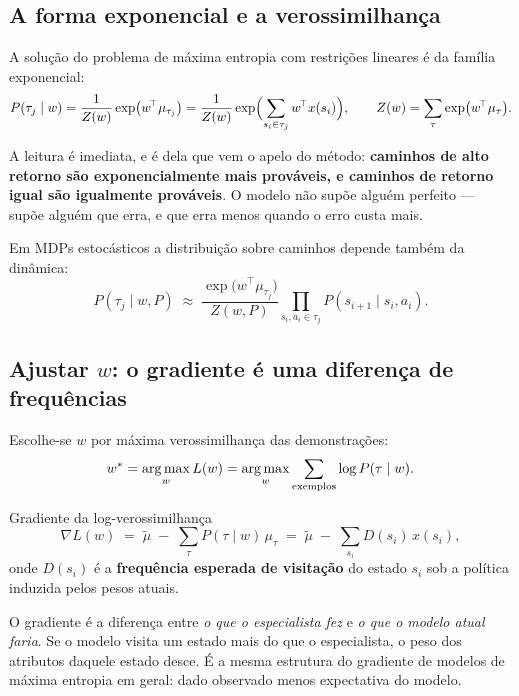 \documentclass[11pt]{article}
\newcommand{\traj}{\tau}
\newcommand{\feat}{x}
\newcommand{\mufeat}{\mu}
\newcommand{\wv}{w}
\begin{document}
\subsection{A forma exponencial e a verossimilhança}

A solução do problema de máxima entropia com restrições lineares é da família
exponencial:
\[
  P(\traj_j \mid \wv) = \frac{1}{Z(\wv)}\exp\bigl(\wv^{\!\top}\mufeat_{\traj_j}\bigr)
   = \frac{1}{Z(\wv)}\exp\Bigl(\sum_{s_i\in\traj_j}\wv^{\!\top}\feat(s_i)\Bigr),
  \qquad
  Z(\wv) = \sum_{\traj}\exp\bigl(\wv^{\!\top}\mufeat_{\traj}\bigr).
\]

A leitura é imediata, e é dela que vem o apelo do método: \textbf{caminhos de alto
retorno são exponencialmente mais prováveis, e caminhos de retorno igual são igualmente
prováveis}. O modelo não supõe alguém perfeito --- supõe alguém que erra, e que erra
menos quando o erro custa mais.

Em MDPs estocásticos a distribuição sobre caminhos depende também da dinâmica:
\[
  P(\traj_j \mid \wv, P) \;\approx\;
    \frac{\exp\bigl(\wv^{\!\top}\mufeat_{\traj_j}\bigr)}{Z(\wv,P)}
    \prod_{s_i,a_i\in\traj_j} P(s_{i+1}\mid s_i,a_i).
\]

\subsection{Ajustar \texorpdfstring{$\wv$}{w}: o gradiente é uma diferença de frequências}

Escolhe-se $\wv$ por máxima verossimilhança das demonstrações:
\[
  \wv^{*} = \argmax_{\wv} L(\wv) = \argmax_{\wv} \sum_{\text{exemplos}} \log P(\traj\mid\wv).
\]

\begin{teobox}{Gradiente da log-verossimilhança}
  \[
    \nabla L(\wv) \;=\; \tilde\mufeat \;-\; \sum_{\traj} P(\traj\mid\wv)\,\mufeat_{\traj}
      \;=\; \tilde\mufeat \;-\; \sum_{s_i} D(s_i)\,\feat(s_i),
  \]
  onde $D(s_i)$ é a \textbf{frequência esperada de visitação} do estado $s_i$ sob a
  política induzida pelos pesos atuais.
\end{teobox}

\begin{ideiabox}
  O gradiente é a diferença entre \emph{o que o especialista fez} e \emph{o que o modelo
  atual faria}. Se o modelo visita um estado mais do que o especialista, o peso dos
  atributos daquele estado desce. É a mesma estrutura do gradiente de modelos de
  máxima entropia em geral: dado observado menos expectativa do modelo.
\end{ideiabox}
\end{document}
